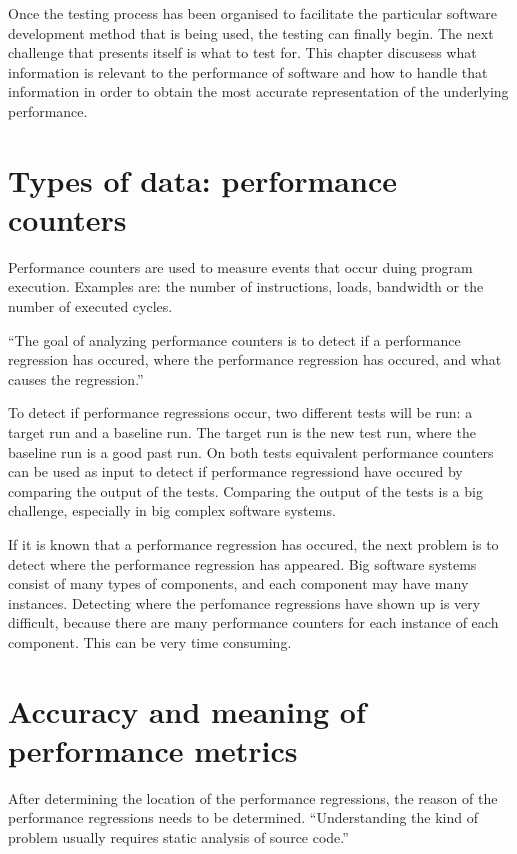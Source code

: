 Once the testing process has been organised to facilitate the particular software development method that is being used, the testing can finally begin. The next challenge that presents itself is what to test for. This chapter discusess what information is relevant to the performance of software and how to handle that information in order to obtain the most accurate representation of the underlying performance.

\section{Types of data: performance counters}
Performance counters are used to measure events that occur duing program execution\cite{PC}. Examples are: the number of instructions, loads, bandwidth or the number of executed cycles.

``The goal of analyzing performance counters is to detect if a performance regression has occured, where the performance regression has occured, and what causes the regression.'' \cite{nguyen2012using}

To detect if performance regressions occur, two different tests will be run: a target run and a baseline run. The target run is the new test run, where the baseline run is a good past run. On both tests equivalent performance counters can be used as input to detect if performance regressiond have occured by comparing the output of the tests. Comparing the output of the tests is a big challenge, especially in big complex software systems.

If it is known that a performance regression has occured, the next problem is to detect where the performance regression has appeared. Big software systems consist of many types of components, and each component may have many instances. Detecting where the perfomance regressions have shown up is very difficult, because there are many performance counters for each instance of each component. This can be very time consuming.

\section{Accuracy and meaning of performance metrics}
After determining the location of the performance regressions, the reason of the performance regressions needs to be determined. ``Understanding the kind of problem usually requires static analysis of source code.'' \cite{nguyen2012using}

